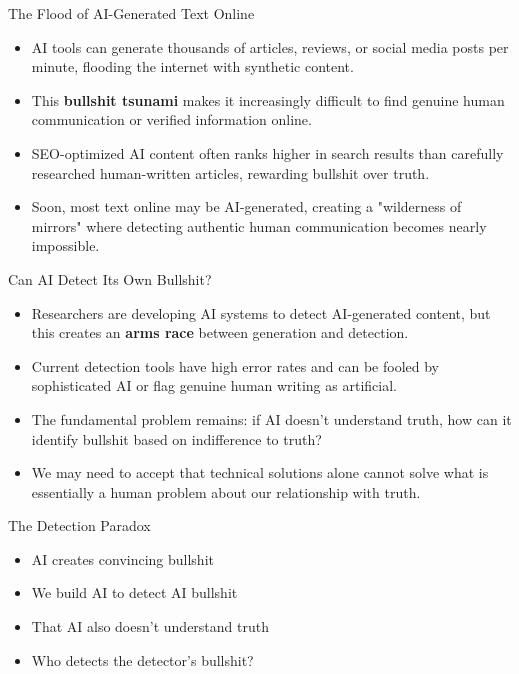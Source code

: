 \documentclass{beamer}
\begin{document}
	\begin{frame}{The Flood of AI-Generated Text Online}
		\begin{itemize}
			\item AI tools can generate thousands of articles, reviews, or social media posts per minute, flooding the internet with synthetic content.
			\item This \textbf{bullshit tsunami} makes it increasingly difficult to find genuine human communication or verified information online.
			\item SEO-optimized AI content often ranks higher in search results than carefully researched human-written articles, rewarding bullshit over truth.
			\item Soon, most text online may be AI-generated, creating a "wilderness of mirrors" where detecting authentic human communication becomes nearly impossible.
		\end{itemize}
		
	\end{frame}
	
	\begin{frame}{Can AI Detect Its Own Bullshit?}
		\begin{itemize}
			\item Researchers are developing AI systems to detect AI-generated content, but this creates an \textbf{arms race} between generation and detection.
			\item Current detection tools have high error rates and can be fooled by sophisticated AI or flag genuine human writing as artificial.
			\item The fundamental problem remains: if AI doesn't understand truth, how can it identify bullshit based on indifference to truth?
			\item We may need to accept that technical solutions alone cannot solve what is essentially a human problem about our relationship with truth.
		\end{itemize}
		
		\begin{block}{The Detection Paradox}
			\begin{itemize}
				\item AI creates convincing bullshit
				\item We build AI to detect AI bullshit
				\item That AI also doesn't understand truth
				\item Who detects the detector's bullshit?
			\end{itemize}
		\end{block}
	\end{frame}
	
\end{document}

